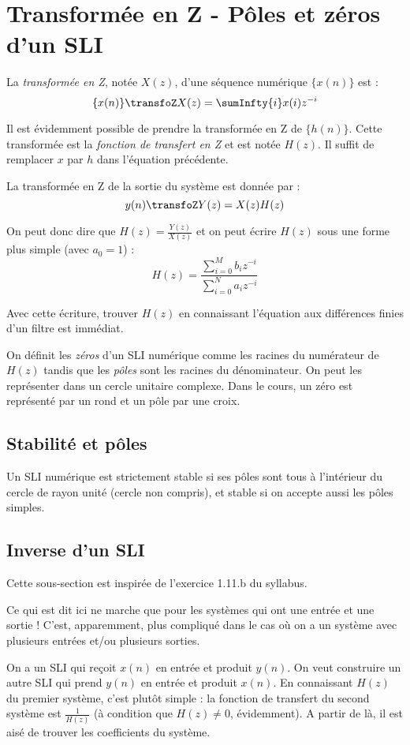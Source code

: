     \section{Transformée en Z - Pôles et zéros d'un SLI}
        La \textit{transformée en Z}, notée $X(z)$, d'une séquence numérique $\{x(n)\}$ est :
        $$
            \{x(n)\} \transfoZ X(z) = \sumInfty{i} x(i) z^{-i}
        $$

        Il est évidemment possible de prendre la transformée en Z de $\{h(n)\}$. Cette transformée est la \textit{fonction de transfert en Z} et est notée $H(z)$. Il suffit de remplacer $x$ par $h$ dans l'équation précédente.

        La transformée en Z de la sortie du système est donnée par :
        $$
            y(n) \transfoZ Y(z) = X(z)H(z)
        $$

        On peut donc dire que $H(z) = \frac{Y(z)}{X(z)}$ et on peut écrire $H(z)$ sous une forme plus simple (avec $a_0 = 1$) :
        $$
            H(z) = \frac{\sum\limits_{i=0}^M b_i z^{-i}}{\sum\limits_{i=0}^N a_i z^{-i}}
        $$

        Avec cette écriture, trouver $H(z)$ en connaissant l'équation aux différences finies d'un filtre est immédiat.

        On définit les \textit{zéros} d'un SLI numérique comme les racines du numérateur de $H(z)$ tandis que les \textit{pôles} sont les racines du dénominateur. On peut les représenter dans un cercle unitaire complexe. Dans le cours, un zéro est représenté par un rond et un pôle par une croix.

        \subsection{Stabilité et pôles}
            Un SLI numérique est strictement stable si ses pôles sont tous à l'intérieur du cercle de rayon unité (cercle non compris), et stable si on accepte aussi les pôles simples.
        
        \subsection{Inverse d'un SLI}
            \begin{remarque}
                Cette sous-section est inspirée de l'exercice 1.11.b du syllabus.

                Ce qui est dit ici ne marche que pour les systèmes qui ont une entrée et une sortie ! C'est, apparemment, plus compliqué dans le cas où on a un système avec plusieurs entrées et/ou plusieurs sorties.
            \end{remarque}

            On a un SLI qui reçoit $x(n)$ en entrée et produit $y(n)$. On veut construire un autre SLI qui prend $y(n)$ en entrée et produit $x(n)$. En connaissant $H(z)$ du premier système, c'est plutôt simple : la fonction de transfert du second système est $\frac{1}{H(z)}$ (à condition que $H(z) \not=0$, évidemment). A partir de là, il est aisé de trouver les coefficients du système.